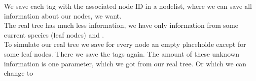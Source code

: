       We save each tag with the associated node ID in a nodelist, where we can save all information
        about our nodes, we want. \\
      The real tree has much less information, we have only information from some current species 
        (leaf nodes) and . \\
      To simulate our real tree we save for every node an empty placeholde except for some leaf nodes.
      There we save the tags again. The amount of these unknown information is one parameter, which we
      got from our real tree. Or which we can change to 

